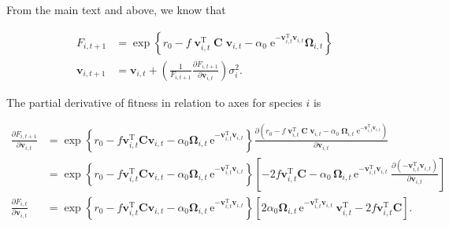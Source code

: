From the main text and above, we know that

\begin{equation}\label{eq:main-text-info-axis-change}
\begin{split}
    F_{i,t+1} &= \exp \left\{
        r_0 - f \; \mathbf{v}_{i,t}^{\textrm{T}} \; \mathbf{C} \; \mathbf{v}_{i,t} -
        \alpha_0 \;\textrm{e}^{- \mathbf{v}_{i,t}^{\textrm{T}} \mathbf{v}_{i,t} } \bm{\Omega}_{i,t}
        \right\} \\
    \mathbf{v}_{i,t+1} &= \mathbf{v}_{i,t} + \left( \frac{1}{F_{i,t+1}}
        \frac{\partial F_{i,t+1}}{\partial \mathbf{v}_{i,t}} \right) \sigma^2_i
    \textrm{.}
\end{split}
\end{equation}


The partial derivative of fitness in relation to axes for species $i$ is


\begin{equation*}
\begin{split}
    \frac{\partial F_{i,t+1}}{\partial \mathbf{v}_{i,t}} &=
        \exp \left\{
            r_0
            - f \mathbf{v}_{i,t}^{\textrm{T}} \mathbf{C} \mathbf{v}_{i,t}
            - \alpha_0  \bm{\Omega}_{i,t} \,
                \textrm{e}^{- \mathbf{v}_{i,t}^{\textrm{T}} \mathbf{v}_{i,t}}
        \right\}
        \frac{\partial \!
            \left(
                r_0
                - f \; \mathbf{v}_{i,t}^{\textrm{T}} \; \mathbf{C} \; \mathbf{v}_{i,t}
                - \alpha_0 \; \bm{\Omega}_{i,t} \;
                    \textrm{e}^{- \mathbf{v}_{i,t}^{\textrm{T}} \mathbf{v}_{i,t}}
            \right)
            }{ \partial \mathbf{v}_{i,t} } \\
     &=
        \exp \left\{
            r_0
            - f \mathbf{v}_{i,t}^{\textrm{T}} \mathbf{C} \mathbf{v}_{i,t}
            - \alpha_0  \bm{\Omega}_{i,t} \,
                \textrm{e}^{- \mathbf{v}_{i,t}^{\textrm{T}} \mathbf{v}_{i,t}}
        \right\}
        \left[
            - 2 f \mathbf{v}_{i,t}^{\textrm{T}} \mathbf{C}
            - \alpha_0 \, \bm{\Omega}_{i,t} \,
                \textrm{e}^{- \mathbf{v}_{i,t}^{\textrm{T}} \mathbf{v}_{i,t} } \:
                \frac{\partial \! \left( - \mathbf{v}_{i,t}^{\textrm{T}} \mathbf{v}_{i,t} \right)
                    }{ \partial \mathbf{v}_{i,t} }
        \right] \\[2ex]
    \frac{ \partial F_{i,t} }{ \partial \mathbf{v}_{i,t} } &=
        \exp \left\{
            r_0
            - f \mathbf{v}_{i,t}^{\textrm{T}} \mathbf{C} \mathbf{v}_{i,t}
            - \alpha_0  \bm{\Omega}_{i,t} \,
                \textrm{e}^{- \mathbf{v}_{i,t}^{\textrm{T}} \mathbf{v}_{i,t}}
        \right\}
        \left[
            2 \alpha_0 \bm{\Omega}_{i,t} \,
                \textrm{e}^{- \mathbf{v}_{i,t}^{\textrm{T}} \mathbf{v}_{i,t}} \:
                \mathbf{v}_{i,t}^{\textrm{T}}
            - 2 f \mathbf{v}_{i,t}^{\textrm{T}} \mathbf{C}
        \right]
    \textrm{.}
\end{split}
\end{equation*}




